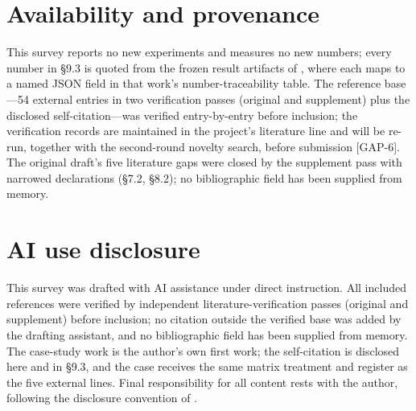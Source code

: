 \documentclass[11pt,a4paper]{article}
\begin{document}
\section*{Availability and provenance}

This survey reports no new experiments and measures no new numbers; every number in §9.3 is quoted from the frozen result artifacts of \cite{key04}, where each maps to a named JSON field in that work's number-traceability table. The reference base—54 external entries in two verification passes (original and supplement) plus the disclosed self-citation—was verified entry-by-entry before inclusion; the verification records are maintained in the project's literature line and will be re-run, together with the second-round novelty search, before submission [GAP-6]. The original draft's five literature gaps were closed by the supplement pass with narrowed declarations (§7.2, §8.2); no bibliographic field has been supplied from memory.

\section*{AI use disclosure}

This survey was drafted with AI assistance under direct instruction. All included references were verified by independent literature-verification passes (original and supplement) before inclusion; no citation outside the verified base was added by the drafting assistant, and no bibliographic field has been supplied from memory. The case-study work \cite{key04} is the author's own first work; the self-citation is disclosed here and in §9.3, and the case receives the same matrix treatment and register as the five external lines. Final responsibility for all content rests with the author, following the disclosure convention of \cite{key04}.
\end{document}
